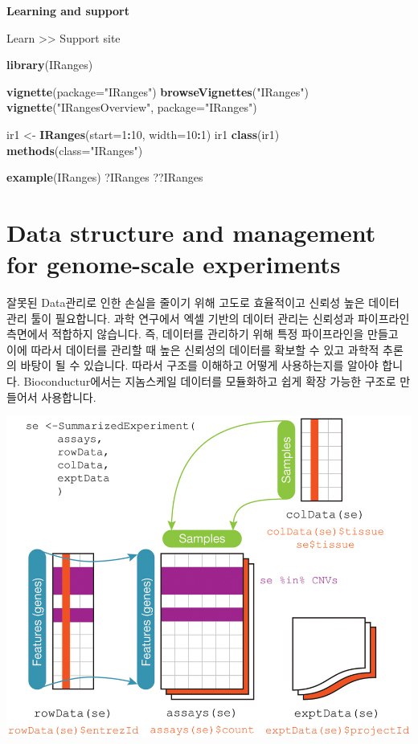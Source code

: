 \documentclass[
]{book}
\newenvironment{Shaded}{\begin{snugshade}}{\end{snugshade}}
\newcommand{\DataTypeTok}[1]{\textcolor[rgb]{0.13,0.29,0.53}{#1}}
\newcommand{\DecValTok}[1]{\textcolor[rgb]{0.00,0.00,0.81}{#1}}
\newcommand{\KeywordTok}[1]{\textcolor[rgb]{0.13,0.29,0.53}{\textbf{#1}}}
\newcommand{\NormalTok}[1]{#1}
\newcommand{\OperatorTok}[1]{\textcolor[rgb]{0.81,0.36,0.00}{\textbf{#1}}}
\newcommand{\StringTok}[1]{\textcolor[rgb]{0.31,0.60,0.02}{#1}}
\begin{document}
\textbf{Learning and support}

Learn \textgreater\textgreater{} Support site

\begin{Shaded}
\begin{Highlighting}[]
\KeywordTok{library}\NormalTok{(IRanges)}

\KeywordTok{vignette}\NormalTok{(}\DataTypeTok{package=}\StringTok{"IRanges"}\NormalTok{)}
\KeywordTok{browseVignettes}\NormalTok{(}\StringTok{"IRanges"}\NormalTok{)}
\KeywordTok{vignette}\NormalTok{(}\StringTok{"IRangesOverview"}\NormalTok{, }\DataTypeTok{package=}\StringTok{"IRanges"}\NormalTok{)}

\NormalTok{ir1 <{-}}\StringTok{ }\KeywordTok{IRanges}\NormalTok{(}\DataTypeTok{start=}\DecValTok{1}\OperatorTok{:}\DecValTok{10}\NormalTok{, }\DataTypeTok{width=}\DecValTok{10}\OperatorTok{:}\DecValTok{1}\NormalTok{)}
\NormalTok{ir1}
\KeywordTok{class}\NormalTok{(ir1)}
\KeywordTok{methods}\NormalTok{(}\DataTypeTok{class=}\StringTok{"IRanges"}\NormalTok{)}

\KeywordTok{example}\NormalTok{(IRanges)}
\NormalTok{?IRanges}
\NormalTok{??IRanges}
\end{Highlighting}
\end{Shaded}

\hypertarget{data-structure-and-management-for-genome-scale-experiments}{%
\section{Data structure and management for genome-scale experiments}\label{data-structure-and-management-for-genome-scale-experiments}}

잘못된 Data관리로 인한 손실을 줄이기 위해 고도로 효율적이고 신뢰성 높은 데이터 관리 툴이 필요합니다. 과학 연구에서 엑셀 기반의 데이터 관리는 신뢰성과 파이프라인 측면에서 적합하지 않습니다. 즉, 데이터를 관리하기 위해 특정 파이프라인을 만들고 이에 따라서 데이터를 관리할 때 높은 신뢰성의 데이터를 확보할 수 있고 과학적 추론의 바탕이 될 수 있습니다. 따라서 구조를 이해하고 어떻게 사용하는지를 알아야 합니다. Bioconductur에서는 지놈스케일 데이터를 모듈화하고 쉽게 확장 가능한 구조로 만들어서 사용합니다.

\includegraphics{images/bioconductor_strucure.jpg}
\end{document}
